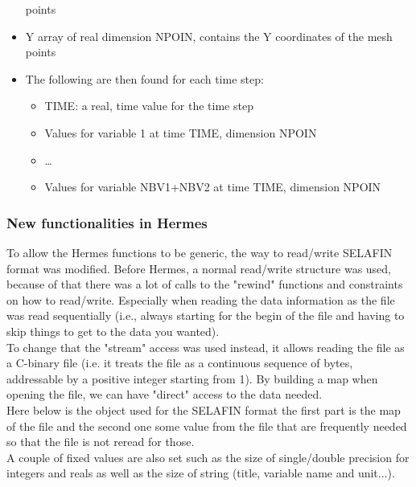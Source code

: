 \begin{itemize}
points
\item Y array of real dimension NPOIN, contains the Y coordinates of the mesh
points
\item The following are then found for each time step:
\begin{itemize}
\item TIME: a real, time value for the time step
\item Values for variable 1 at time TIME, dimension NPOIN
\item \ldots
\item Values for variable NBV1+NBV2 at time TIME, dimension NPOIN
\end{itemize}
\end{itemize}

%
\subsubsection{New functionalities in Hermes}
%
To allow the Hermes functions to be generic, the way to read/write SELAFIN
format was modified. Before Hermes, a normal read/write structure was used,
because of that there was a lot of calls to the "rewind" functions and
constraints on how to read/write. Especially when reading the data information
as the file was read sequentially (i.e., always starting for the begin of the
file and having to skip things to get to the data you wanted).\\
%
To change that the "stream" access was used instead, it allows reading the file
as a C-binary file (i.e. it treats the file as a continuous sequence of bytes,
addressable by a positive integer starting from 1). By building a map when
opening the file, we can have "direct" access to the data needed.\\
%
Here below is the object used for the SELAFIN format the first part is the map
of the file and the second one some value from the file that are frequently
needed so that the file is not reread for those.\\
%
A couple of fixed values are also set such as the size of single/double
precision for integers and reals as well as the size of string (title, variable
name and unit...).
%

